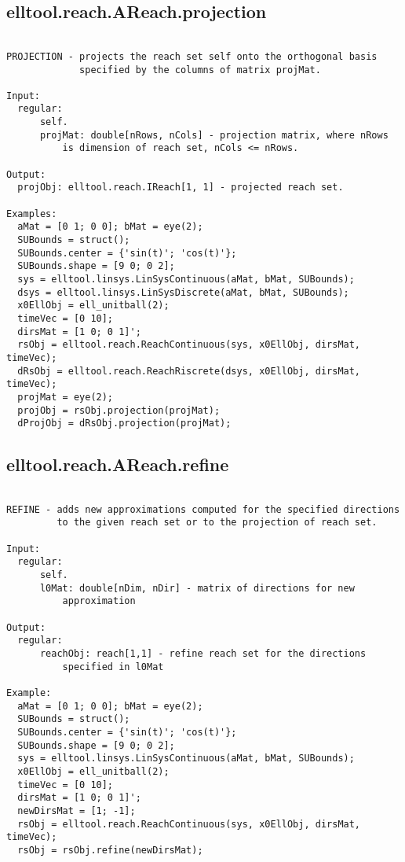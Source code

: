 \subsection{\texorpdfstring{elltool.reach.AReach.projection}{projection}}\label{method:elltool.reach.AReach.projection}
\begin{verbatim}

PROJECTION - projects the reach set self onto the orthogonal basis
             specified by the columns of matrix projMat.

Input:
  regular:
      self.
      projMat: double[nRows, nCols] - projection matrix, where nRows
          is dimension of reach set, nCols <= nRows.

Output:
  projObj: elltool.reach.IReach[1, 1] - projected reach set.

Examples:
  aMat = [0 1; 0 0]; bMat = eye(2);
  SUBounds = struct();
  SUBounds.center = {'sin(t)'; 'cos(t)'};
  SUBounds.shape = [9 0; 0 2];
  sys = elltool.linsys.LinSysContinuous(aMat, bMat, SUBounds);
  dsys = elltool.linsys.LinSysDiscrete(aMat, bMat, SUBounds);
  x0EllObj = ell_unitball(2);
  timeVec = [0 10];
  dirsMat = [1 0; 0 1]';
  rsObj = elltool.reach.ReachContinuous(sys, x0EllObj, dirsMat, timeVec);
  dRsObj = elltool.reach.ReachRiscrete(dsys, x0EllObj, dirsMat, timeVec);
  projMat = eye(2);
  projObj = rsObj.projection(projMat);
  dProjObj = dRsObj.projection(projMat);
\end{verbatim}
\subsection{\texorpdfstring{elltool.reach.AReach.refine}{refine}}\label{method:elltool.reach.AReach.refine}
\begin{verbatim}

REFINE - adds new approximations computed for the specified directions
         to the given reach set or to the projection of reach set.

Input:
  regular:
      self.
      l0Mat: double[nDim, nDir] - matrix of directions for new
          approximation

Output:
  regular:
      reachObj: reach[1,1] - refine reach set for the directions
          specified in l0Mat

Example:
  aMat = [0 1; 0 0]; bMat = eye(2);
  SUBounds = struct();
  SUBounds.center = {'sin(t)'; 'cos(t)'};
  SUBounds.shape = [9 0; 0 2];
  sys = elltool.linsys.LinSysContinuous(aMat, bMat, SUBounds);
  x0EllObj = ell_unitball(2);
  timeVec = [0 10];
  dirsMat = [1 0; 0 1]';
  newDirsMat = [1; -1];
  rsObj = elltool.reach.ReachContinuous(sys, x0EllObj, dirsMat, timeVec);
  rsObj = rsObj.refine(newDirsMat);
\end{verbatim}
